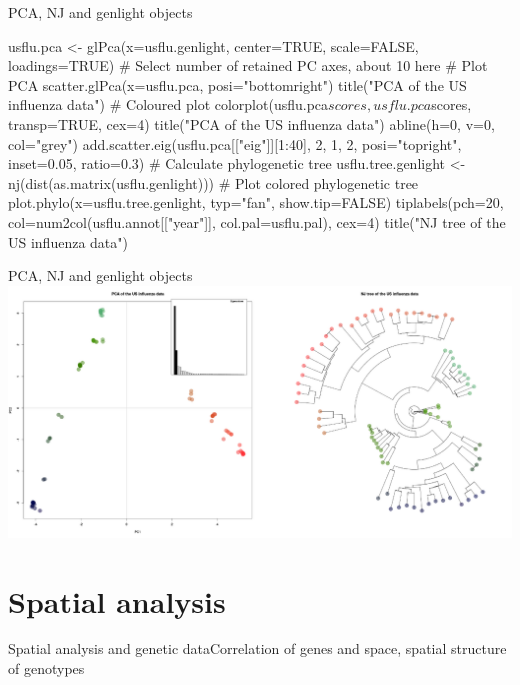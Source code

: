 \documentclass[compress, ucs, xelatex, 11pt, xcolor=svgnames,
  hyperref={
    bookmarks=true,
    unicode=true,
    colorlinks=true,
    pdftitle={Molecular data in R},
    plainpages=false,
    pdfauthor={Vojtech Zeisek},
    pdfsubject={Course about phylogeny and evolution in R},
    pdfcreator={XeLaTeX},
    pdfkeywords={R, evolution, phylogeny, molecular data},
    linkcolor=Tomato,
    anchorcolor=SaddleBrown,
    citecolor=Goldenrod,
    filecolor=DarkMagenta,
    menucolor=Sienna,
    urlcolor=DarkTurquoise,
    pdftex},
  url={hyphens, lowtilde} %
  ]{beamer}
\begin{document}
\begin{frame}[fragile]{PCA, NJ and genlight objects}
  \begin{spluscode}
    usflu.pca <- glPca(x=usflu.genlight, center=TRUE, scale=FALSE,
      loadings=TRUE) # Select number of retained PC axes, about 10 here
    # Plot PCA
    scatter.glPca(x=usflu.pca, posi="bottomright")
    title("PCA of the US influenza data")
    # Coloured plot
    colorplot(usflu.pca$scores, usflu.pca$scores, transp=TRUE, cex=4)
    title("PCA of the US influenza data")
    abline(h=0, v=0, col="grey")
    add.scatter.eig(usflu.pca[["eig"]][1:40], 2, 1, 2, posi="topright",
      inset=0.05, ratio=0.3)
    # Calculate phylogenetic tree
    usflu.tree.genlight <- nj(dist(as.matrix(usflu.genlight)))
    # Plot colored phylogenetic tree
    plot.phylo(x=usflu.tree.genlight, typ="fan", show.tip=FALSE)
    tiplabels(pch=20, col=num2col(usflu.annot[["year"]],
      col.pal=usflu.pal), cex=4)
    title("NJ tree of the US influenza data")
  \end{spluscode}
\end{frame}

\begin{frame}{PCA, NJ and genlight objects}
  \includegraphics[width=\textwidth]{flu_pcoa_nj.png}
\end{frame}

\section{Spatial analysis}

\begin{frame}{Spatial analysis and genetic data}{Correlation of genes and space, spatial structure of genotypes}
  \tableofcontents[currentsection, sectionstyle=show/hide, hideothersubsections]
\end{frame}
\end{document}
